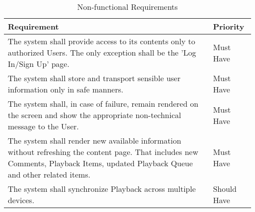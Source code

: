 \begin{table}[h!]
    \centering
    \begin{tabular}{|p{12cm}|p{3cm}|}
        \hline
        \textbf{Requirement}                                                                                                                                                               & \textbf{Priority} \\
        \hline
        The system shall provide access to its contents only to authorized Users. The only exception shall be the 'Log In/Sign Up' page. & Must Have \\
        \hline
        The system shall store and transport sensible user information only in safe manners. & Must Have \\
        \hline
        The system shall, in case of failure, remain rendered on the screen and show the appropriate non-technical message to the User. & Must Have \\
        \hline
        The system shall render new available information without refreshing the content page. That includes new Comments, Playback Items, updated Playback Queue and other related items. & Must Have \\
        \hline
        The system shall synchronize Playback across multiple devices.                                                                                                                     & Should Have       \\
        \hline
    \end{tabular}
    \caption{Non-functional Requirements}
\end{table}